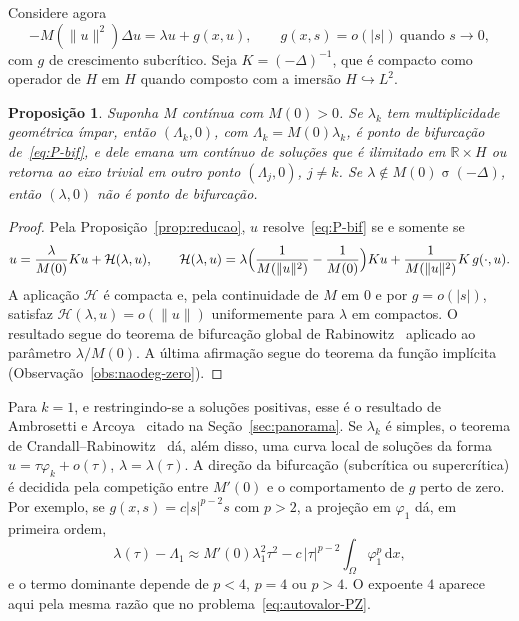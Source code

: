 \documentclass[11pt,a4paper]{article}
\theoremstyle{plain}
\newtheorem{proposicao}[teorema]{Proposição}
\theoremstyle{definition}
\theoremstyle{remark}
\newcommand{\R}{\mathbb{R}}
\newcommand{\norm}[1]{\lVert #1\rVert}
\newcommand{\abs}[1]{\lvert #1\rvert}
\newcommand{\dx}{\,\mathrm{d}x}
\DeclareMathOperator{\spec}{\sigma}
\begin{document}
Considere agora
\begin{equation}\label{eq:P-bif}
-M(\norm{u}^2)\Delta u=\lambda u+g(x,u),\qquad g(x,s)=o(\abs{s})\ \text{quando }s\to0,
\end{equation}
com $g$ de crescimento subcrítico. Seja $K=(-\Delta)^{-1}$, que é compacto como
operador de $H$ em $H$ quando composto com a imersão $H\hookrightarrow L^2$.

\begin{proposicao}\label{prop:bif-zero}
Suponha $M$ contínua com $M(0)>0$. Se $\lambda_k$ tem multiplicidade
geométrica ímpar, então $(\Lambda_k,0)$, com $\Lambda_k=M(0)\lambda_k$, é ponto
de bifurcação de~\eqref{eq:P-bif}, e dele emana um contínuo de soluções que é
ilimitado em $\R\times H$ ou retorna ao eixo trivial em outro ponto
$(\Lambda_j,0)$, $j\ne k$. Se $\lambda\notin M(0)\spec(-\Delta)$, então
$(\lambda,0)$ não é ponto de bifurcação.
\end{proposicao}

\begin{proof}
Pela Proposição~\ref{prop:reducao}, $u$ resolve~\eqref{eq:P-bif} se e somente se
\[
u=\frac{\lambda}{M(0)}Ku+\mathcal{H}(\lambda,u),\qquad
\mathcal{H}(\lambda,u)=\lambda\Bigl(\frac{1}{M(\norm{u}^2)}-\frac{1}{M(0)}\Bigr)Ku
+\frac{1}{M(\norm{u}^2)}K\,g(\cdot,u).
\]
A aplicação $\mathcal{H}$ é compacta e, pela continuidade de $M$ em $0$ e por
$g=o(\abs{s})$, satisfaz $\mathcal{H}(\lambda,u)=o(\norm{u})$ uniformemente para
$\lambda$ em compactos. O resultado segue do teorema de bifurcação global de
Rabinowitz~\cite{Rabinowitz1971} aplicado ao parâmetro $\lambda/M(0)$. A
última afirmação segue do teorema da função implícita
(Observação~\ref{obs:naodeg-zero}).
\end{proof}

Para $k=1$, e restringindo-se a soluções positivas, esse é o resultado de
Ambrosetti e Arcoya~\cite{AmbrosettiArcoya2017} citado na
Seção~\ref{sec:panorama}. Se $\lambda_k$ é simples, o teorema de
Crandall--Rabinowitz~\cite{CrandallRabinowitz1971} dá, além disso, uma curva
local de soluções da forma $u=\tau\varphi_k+o(\tau)$, $\lambda=\lambda(\tau)$.
A direção da bifurcação (subcrítica ou supercrítica) é decidida pela
competição entre $M'(0)$ e o comportamento de $g$ perto de zero. Por exemplo,
se $g(x,s)=c\abs{s}^{p-2}s$ com $p>2$, a projeção em $\varphi_1$ dá, em
primeira ordem,
\[
\lambda(\tau)-\Lambda_1\approx M'(0)\lambda_1^2\tau^2
-c\,\abs{\tau}^{p-2}\int_\Omega\varphi_1^{p}\dx,
\]
e o termo dominante depende de $p<4$, $p=4$ ou $p>4$. O expoente $4$ aparece
aqui pela mesma razão que no problema~\eqref{eq:autovalor-PZ}.
\end{document}
